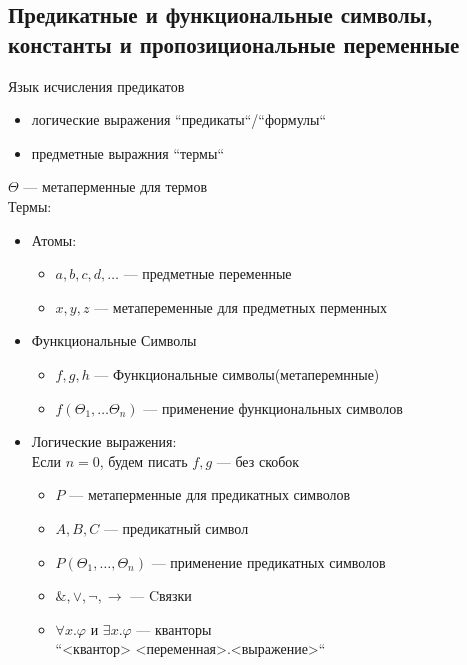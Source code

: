 \documentclass[english]{article}
\begin{document}
\subsection{Предикатные и функциональные символы, константы и пропозициональные переменные}
\label{sec:orgab4f820}
\begin{definition}
	Язык исчисления предикатов
	\begin{itemize}
		\item логические выражения ``предикаты``/``формулы``
		\item предметные выражния ``термы``
	\end{itemize}
	\(\Theta\) --- метаперменные для термов \\
	Термы:
	\begin{itemize}
		\item Атомы:
		      \begin{itemize}
			      \item \(a, b, c, d, \dots\) --- предметные переменные
			      \item \(x, y, z\) --- метапеременные для предметных перменных
		      \end{itemize}
		\item Функциональные Символы
		      \begin{itemize}
			      \item \(f, g, h\) --- Функциональные символы(метаперемнные)
			      \item \(f(\Theta_1, \dots \Theta_n)\) --- применение функциональных символов
		      \end{itemize}
		\item Логические выражения: \\
		      \color{gray}Если \(n = 0\), будем писать \(f, g\) --- без скобок\color{black}
		      \begin{itemize}
			      \item \(P\) --- метаперменные для предикатных символов
			      \item \(A, B, C\) --- предикатный символ
			      \item \(P(\Theta_1, \dots, \Theta_n)\) --- применение предикатных символов
			      \item \(\&, \vee, \neg, \to\) --- Cвязки
			      \item \(\forall x.\varphi\) и \(\exists x.\varphi\) --- кванторы \\
			            \color{gray}``<квантор> <переменная>.<выражение>``\color{black} \\
		      \end{itemize}
	\end{itemize}
	\label{orgfbe9308}
\end{definition}
\end{document}
